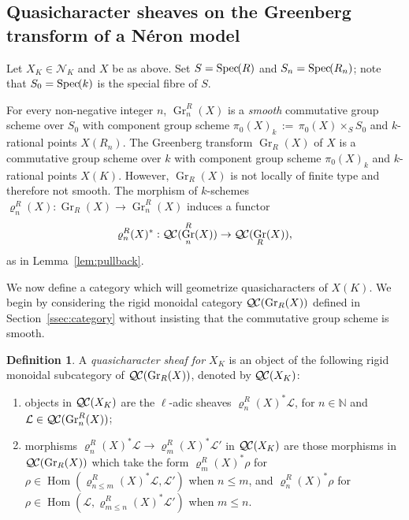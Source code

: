 \documentclass[CM,Submssn,SecEq]{degruyter-crelle} %
\theoremstyle{plain}
\theoremstyle{definition}
\newtheorem{definition}[theorem]{Definition}
\theoremstyle{remark}
\newcommand{\NN}{{\mathbb{N}}}
\newcommand{\Fq}{k}
\DeclareMathOperator{\Hom}{Hom}
\DeclareMathOperator{\Gr}{Gr}
\newcommand{\Spec}[1]{{\operatorname{Spec}\hskip-1pt( #1 )}}
\newcommand{\ceq}{{\, :=\, }}
\newcommand{\qcs}[1]{{\mathcal{#1}}}
\newcommand{\QC}{{\mathcal{Q\hskip-0.8pt C}}}
\begin{document}
\subsection{Quasicharacter sheaves on the Greenberg transform of a N\'eron model} \label{ssec:qc_on_GN}
 
Let $X_K \in \mathcal{N}_K$ and $X$ be as above.
Set $S = \Spec{R}$ and $S_n = \Spec{R_n}$;
note that $S_0 = \Spec{\Fq}$ is the special fibre of $S$.

For every non-negative integer $n$, $\Gr^R_n(X)$ is a {\it smooth} commutative group scheme over $S_0$
with component group scheme $\pi_0(X)_{\Fq} \ceq \pi_0(X) \times_S S_0$ and $\Fq$-rational points $X(R_n).$
%
The Greenberg transform $\Gr_R(X)$ of $X$ is a commutative group scheme over $\Fq$
with component group scheme $\pi_0(X)_{\Fq}$
and $\Fq$-rational points $X(K).$
However, $\Gr_R(X)$ is not locally of finite type and therefore not smooth.
%
The morphism of $\Fq$-schemes $\varrho^R_n(X) : \Gr_R(X) \to \Gr^R_n(X)$ induces a functor
\[
\varrho^R_n(X)^* : \QC(\Gr^R_n(X)) \to \QC(\Gr_R(X)),
\]
as in Lemma~\ref{lem:pullback}.

We now define a category which will geometrize quasicharacters of $X(K)$.
We begin by considering the rigid monoidal category $\QC(\Gr_R(X))$ defined in Section~\ref{ssec:category} without insisting that the commutative group scheme is smooth.

\begin{definition}
A {\it quasicharacter sheaf for $X_K$} is an object of
the following rigid monoidal subcategory of $\QC(\Gr_R(X))$, denoted by $\QC(X_K)$:
\begin{enumerate}
\item
objects in $\QC(X_K)$ are the $\ell$-adic sheaves $\varrho^R_n(X)^*\qcs{L}$, for $n\in \NN$ and $\qcs{L} \in \QC(\Gr^R_n(X))$; 
\item
morphisms $\varrho^R_n(X)^*\qcs{L} \to \varrho^R_m(X)^*\qcs{L}'$ in $\QC(X_K)$ are those morphisms in $\QC(\Gr_R(X))$ which take the form $\varrho^R_m(X)^*\rho$ for $\rho \in \Hom(\varrho^R_{n\leq m}(X)^*\qcs{L},\qcs{L}')$ when $n\leq m$, and $\varrho^R_n(X)^*\rho$ for $\rho \in \Hom(\qcs{L},\varrho^R_{m\leq n}(X)^*\qcs{L}')$ when $m\leq n$.
\end{enumerate}

\end{definition}
\end{document}
